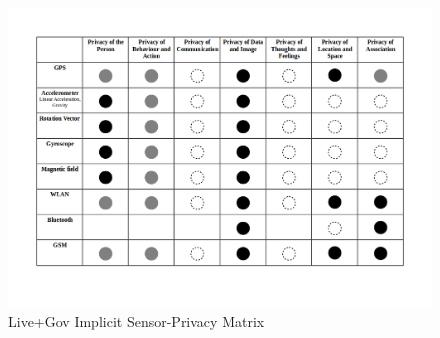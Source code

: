\begin{figure}
\centering
\includegraphics[width=\textwidth]{diagrams/png/implicit-sensor-privacy-matrix.png}



\caption{Live+Gov Implicit Sensor-Privacy Matrix}
\label{figure:Live+Gov Implicit Sensor-Privacy Matrix}
\end{figure}
